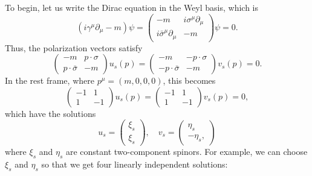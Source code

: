 \documentclass[11pt]{article}
\theoremstyle{definition}
\begin{document}
To begin, let us write the Dirac equation in the Weyl basis, which is 
\begin{equation}
    (i\gamma^\mu\partial_\mu-m)\psi = 
    \begin{pmatrix}
        -m & i\sigma^\mu\partial_\mu \\
        i\bar{\sigma}^\mu\partial_\mu & -m
    \end{pmatrix} \psi = 0.
\end{equation}
Thus, the polarization vectors satisfy
\begin{equation}
    \begin{pmatrix}
        -m & p \cdot \sigma \\
        p \cdot \bar{\sigma} & -m
    \end{pmatrix}u_s(p) = 
    \begin{pmatrix}
        -m & -p \cdot \sigma \\
        -p \cdot \bar{\sigma} & -m
    \end{pmatrix}v_s(p) = 0.
    \label{Eq. matrix dirac}
\end{equation}
In the rest frame, where $p^\mu = (m,0,0,0)$, this becomes
\begin{equation}
    \begin{pmatrix}
        -1 &  1 \\
        1  & -1
    \end{pmatrix}u_s(p) = 
    \begin{pmatrix}
        -1 &  1 \\
        1  & -1
    \end{pmatrix}v_s(p) = 0,
\end{equation}
which have the solutions 
\begin{equation}
    u_s =
    \begin{pmatrix}
        \xi_s\\
        \xi_s
    \end{pmatrix}, \quad v_s =
        \begin{pmatrix}
        \eta_s\\
        -\eta_s,
    \end{pmatrix}
\end{equation}
where $\xi_s$ and $\eta_s$ are constant two-component spinors. For example, we can choose $\xi_s$ and $\eta_s$ so that we get four linearly independent solutions:
\end{document}
